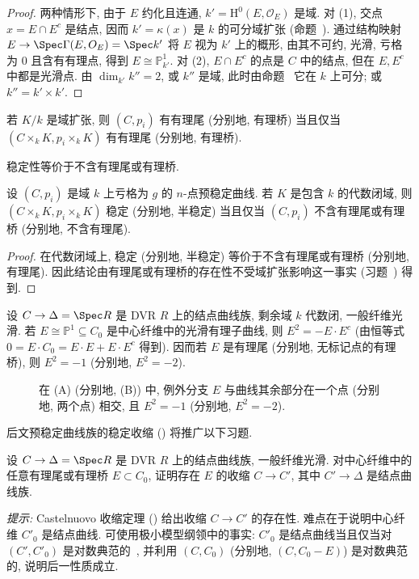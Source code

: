 \begin{proof}
两种情形下, 由于 $E$ 约化且连通, $k'=\mathrm H^0(E,\allowbreak \mathcal O_E)$ 是域. 对 (1), 交点 $x=E\cap E^c$ 是结点, 因而 $k'=\kappa(x)$ 是 $k$ 的可分域扩张 (命题~). 通过结构映射 $E\to\Spec\Gamma(E,\allowbreak \mathcal O_E)=\Spec k'$ 将 $E$ 视为 $k'$ 上的概形, 由其不可约, 光滑, 亏格为 $0$ 且含有有理点, 得到 $E\cong\mathbb P_{k'}^1$. 对 (2), $E\cap E^c$ 的点是 $C$ 中的结点, 但在 $E,\allowbreak E^c$ 中都是光滑点. 由 $\dim_{k'}k''=2$, 或 $k''$ 是域, 此时由命题~ 它在 $k$ 上可分; 或 $k''=k'\times k'$.
\end{proof}
\begin{exercise}\label{src:6.3.14}
若 $K/k$ 是域扩张, 则 $(C,\allowbreak p_i)$ 有有理尾 (分别地, 有理桥) 当且仅当 $(C\times_k K,\allowbreak p_i\times_k K)$ 有有理尾 (分别地, 有理桥).
\end{exercise}
稳定性等价于不含有理尾或有理桥.
\begin{proposition}\label{src:6.3.15}
设 $(C,\allowbreak p_i)$ 是域 $k$ 上亏格为 $g$ 的 $n$-点预稳定曲线. 若 $K$ 是包含 $k$ 的代数闭域, 则 $(C\times_k K,\allowbreak p_i\times_k K)$ 稳定 (分别地, 半稳定) 当且仅当 $(C,\allowbreak p_i)$ 不含有理尾或有理桥 (分别地, 不含有理尾).
\end{proposition}
\begin{proof}
在代数闭域上, 稳定 (分别地, 半稳定) 等价于不含有理尾或有理桥 (分别地, 有理尾). 因此结论由有理尾或有理桥的存在性不受域扩张影响这一事实 (习题~) 得到.
\end{proof}
\begin{remark}[与 $-1$ 和 $-2$ 曲线的关系]\label{src:6.3.16}
设 $C\to\Delta=\Spec R$ 是 DVR $R$ 上的结点曲线族, 剩余域 $k$ 代数闭, 一般纤维光滑. 若 $E\cong\mathbb P^1\subseteq C_0$ 是中心纤维中的光滑有理子曲线, 则 $E^2=-E\cdot E^c$ (由恒等式 $0=E\cdot C_0=E\cdot E+E\cdot E^c$ 得到). 因而若 $E$ 是有理尾 (分别地, 无标记点的有理桥), 则 $E^2=-1$ (分别地, $E^2=-2$).
\end{remark}
\begin{figure}[H]\centering
\begingroup\renewcommand{\thefigure}{6.3.16}\renewcommand{\theHfigure}{6.3.16-figure}\caption{在 (A) (分别地, (B)) 中, 例外分支 $E$ 与曲线其余部分在一个点 (分别地, 两个点) 相交, 且 $E^2=-1$ (分别地, $E^2=-2$).}\label{src:6.3.16-figure}\endgroup\addtocounter{theorem}{-1}
\end{figure}
后文预稳定曲线族的稳定收缩 () 将推广以下习题.
\begin{exercise}[困难]\label{src:6.3.17}
设 $C\to\Delta=\Spec R$ 是 DVR $R$ 上的结点曲线族, 一般纤维光滑. 对中心纤维中的任意有理尾或有理桥 $E\subset C_0$, 证明存在 $E$ 的收缩 $C\to\allowbreak C'$, 其中 $C'\to\Delta$ 是结点曲线族.

\textit{提示:} Castelnuovo 收缩定理 () 给出收缩 $C\to\allowbreak C'$ 的存在性. 难点在于说明中心纤维 $C'_0$ 是结点曲线. 可使用极小模型纲领中的事实: $C'_0$ 是结点曲线当且仅当对 $(C',\allowbreak C'_0)$ 是对数典范的~\cite[推论 2.32, 定理 4.9(2)]{Kol13}, 并利用 $(C,\allowbreak C_0)$ (分别地, $(C,\allowbreak C_0-E)$) 是对数典范的, 说明后一性质成立.
\end{exercise}
